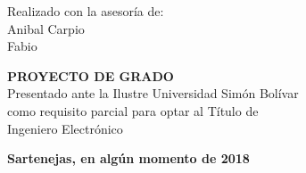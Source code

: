 		    \vspace{1cm}
    \begin{center}
        Realizado con la asesoría de:\\
        Anibal Carpio\\
				Fabio\\
    \end{center}

		    \vspace{1.5cm}
    \begin{center}
        \textbf{PROYECTO DE GRADO}\\
				Presentado ante la Ilustre Universidad Simón Bolívar\\
				como requisito parcial para optar al Título de\\
				Ingeniero Electrónico\\
    \end{center}

	\vspace{1.7cm}
    \begin{center}
		\textbf{Sartenejas, en algún momento de 2018}
    \end{center}
    \pagebreak
